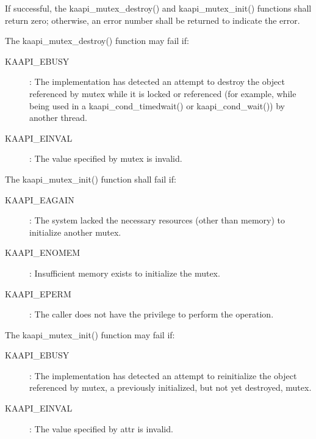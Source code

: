 \begin{description}
If successful, the kaapi\_mutex\_destroy() and kaapi\_mutex\_init() functions
shall return zero; otherwise, an error number shall be returned to indicate
the error.

The kaapi\_mutex\_destroy() function may fail if:

\begin{description}
\item [KAAPI\_EBUSY]: The implementation has detected an attempt to destroy
  the object referenced by mutex while it is locked or referenced (for
  example, while being used in a kaapi\_cond\_timedwait() or
  kaapi\_cond\_wait()) by another thread.
\item [KAAPI\_EINVAL]: The value specified by mutex is invalid.
\end{description}

The kaapi\_mutex\_init() function shall fail if:

\begin{description}
\item [KAAPI\_EAGAIN]: The system lacked the necessary resources (other than
  memory) to initialize another mutex.
\item [KAAPI\_ENOMEM]: Insufficient memory exists to initialize the mutex.
\item [KAAPI\_EPERM]: The caller does not have the privilege to perform the
  operation.
\end{description}

The kaapi\_mutex\_init() function may fail if:

\begin{description}
\item [KAAPI\_EBUSY]: The implementation has detected an attempt to
  reinitialize the object referenced by mutex, a previously initialized, but
  not yet destroyed, mutex.
\item [KAAPI\_EINVAL]: The value specified by attr is invalid.
\end{description}
\end{description}

